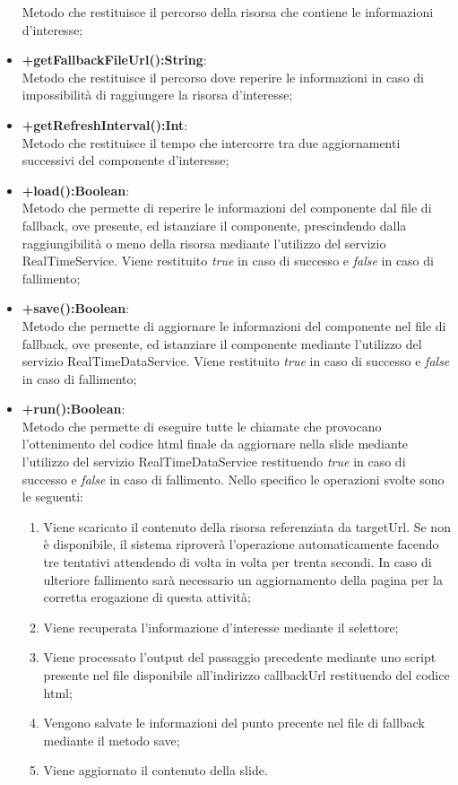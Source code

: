 \begin{itemize}
	Metodo che restituisce il percorso della risorsa che contiene le informazioni d'interesse;
	\item \textbf{+getFallbackFileUrl():String}:\\
	Metodo che restituisce il percorso dove reperire le informazioni in caso di impossibilità di raggiungere la risorsa d'interesse;
	\item \textbf{+getRefreshInterval():Int}:\\
	Metodo che restituisce il tempo che intercorre tra due aggiornamenti successivi del componente d'interesse;
	\item \textbf{+load():Boolean}:\\
	Metodo che permette di reperire le informazioni del componente dal file di fallback, ove presente, ed istanziare il componente, prescindendo dalla raggiungibilità o meno della risorsa mediante l'utilizzo del servizio RealTimeService. Viene restituito \textit{true} in caso di successo e \textit{false} in caso di fallimento;
	\item \textbf{+save():Boolean}:\\
	Metodo che permette di aggiornare le informazioni del componente nel file di fallback, ove presente, ed istanziare il componente mediante l'utilizzo del servizio RealTimeDataService. Viene restituito \textit{true} in caso di successo e \textit{false} in caso di fallimento;
	\item \textbf{+run():Boolean}:\\
	Metodo che permette di eseguire tutte le chiamate che provocano l'ottenimento del codice html finale da aggiornare nella slide mediante l'utilizzo del servizio RealTimeDataService restituendo \textit{true} in caso di successo e \textit{false} in caso di fallimento.
	Nello specifico le operazioni svolte sono le seguenti:
	\begin{enumerate}
		\item Viene scaricato il contenuto della risorsa referenziata da targetUrl. Se non è disponibile, il sistema riproverà l'operazione automaticamente facendo tre tentativi attendendo di volta in volta per trenta secondi. In caso di ulteriore fallimento sarà necessario un aggiornamento della pagina per la corretta erogazione di questa attività;
		\item Viene recuperata l'informazione d'interesse mediante il selettore;
		\item Viene processato l'output del passaggio precedente mediante uno script presente nel file disponibile all'indirizzo callbackUrl restituendo del codice html;
		\item Vengono salvate le informazioni del punto precente nel file di fallback mediante il metodo save;
		\item Viene aggiornato il contenuto della slide.
	\end{enumerate}
	
\end{itemize}

